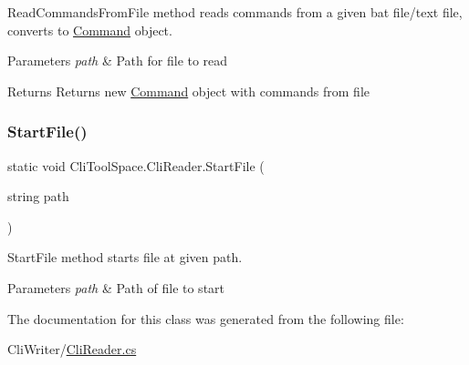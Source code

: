 Read\+Commands\+From\+File method reads commands from a given bat file/text file, converts to \mbox{\hyperlink{class_cli_tool_space_1_1_command}{Command}} object. 


\begin{DoxyParams}{Parameters}
{\em path} & Path for file to read\\
\hline
\end{DoxyParams}
\begin{DoxyReturn}{Returns}
Returns new \mbox{\hyperlink{class_cli_tool_space_1_1_command}{Command}} object with commands from file
\end{DoxyReturn}
\mbox{\label{class_cli_tool_space_1_1_cli_reader_ad5a2e2c127e76205a40d63d14e5abeb4}} 
\subsubsection{\texorpdfstring{StartFile()}{StartFile()}}
{\footnotesize\ttfamily static void Cli\+Tool\+Space.\+Cli\+Reader.\+Start\+File (\begin{DoxyParamCaption}\item[{string}]{path }\end{DoxyParamCaption})\hspace{0.3cm}{\ttfamily [static]}}



Start\+File method starts file at given path. 


\begin{DoxyParams}{Parameters}
{\em path} & Path of file to start\\
\hline
\end{DoxyParams}


The documentation for this class was generated from the following file\+:\begin{DoxyCompactItemize}
\item 
Cli\+Writer/\mbox{\hyperlink{_cli_reader_8cs}{Cli\+Reader.\+cs}}\end{DoxyCompactItemize}
